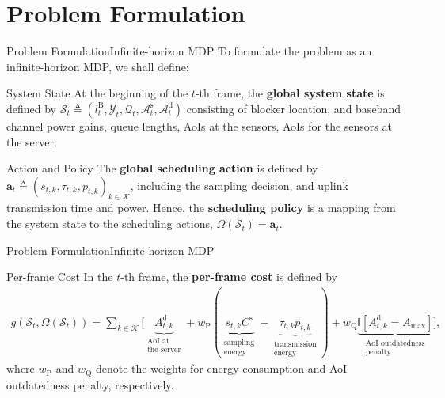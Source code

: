 \documentclass[aspectratio=169]{beamer}
\begin{document}
\section{Problem Formulation}
\begin{frame}{Problem Formulation}{Infinite-horizon MDP}
    To formulate the problem as an infinite-horizon MDP, we shall define:
    \begin{block}{System State}
        At the beginning of the $t$-th frame, the \textbf{global system state} is defined by $\mathcal{S}_{t}\!\triangleq\!(l_{t}^{\mathrm{B}},\mathcal{Y}_{t},\mathcal{Q}_{t},\mathcal{A}_{t}^{\mathrm{s}},\mathcal{A}_{t}^{\mathrm{d}})$ consisting of blocker location, and baseband channel power gains, queue lengths, AoIs at the sensors, AoIs for the sensors at the server.
    \end{block}

    \begin{block}{Action and Policy}
        The \textbf{global scheduling action} is defined by $\mathbf{a}_{t}\!\triangleq\!(s_{t,k},\tau_{t,k},p_{t,k})_{k\in\mathcal{K}}$, including the sampling decision, and uplink transmission time and power.
        Hence, the \textbf{scheduling policy} is a mapping from the system state to the scheduling actions, $\Omega(\mathcal{S}_{t})=\mathbf{a}_{t}$.
    \end{block}
\end{frame}

\begin{frame}{Problem Formulation}{Infinite-horizon MDP}
    \begin{block}{Per-frame Cost}
        In the $t$-th frame, the \textbf{per-frame cost} is defined by
        \begin{align*}
            g(\mathcal{S}_{t},\Omega(\mathcal{S}_{t}))
            =
            \sum\nolimits_{k\in\mathcal{K}}\big[
                \underbrace{A_{t,k}^{\mathrm{d}}}_{\substack{\text{AoI at}\\\text{the server}}}
                +
                w_{\mathrm{P}}(
                    \underbrace{s_{t,k}C^{\mathrm{s}}}_{\substack{\text{sampling}\\\text{energy}}}
                    +
                    \underbrace{\tau_{t,k}p_{t,k}}_{\substack{\text{transmission}\\\text{energy}}}
                )
                +
                w_{\mathrm{Q}}
                \underbrace{\mathbb{I}[A_{t,k}^{\mathrm{d}}=A_{\mathrm{max}}]}_{\substack{\text{AoI outdatedness}\\\text{penalty}}}
                \big],
        \end{align*}
        where $w_{\mathrm{P}}$ and $w_{\mathrm{Q}}$ denote the weights for energy consumption and AoI outdatedness penalty, respectively.
    \end{block}
\end{frame}
\end{document}
